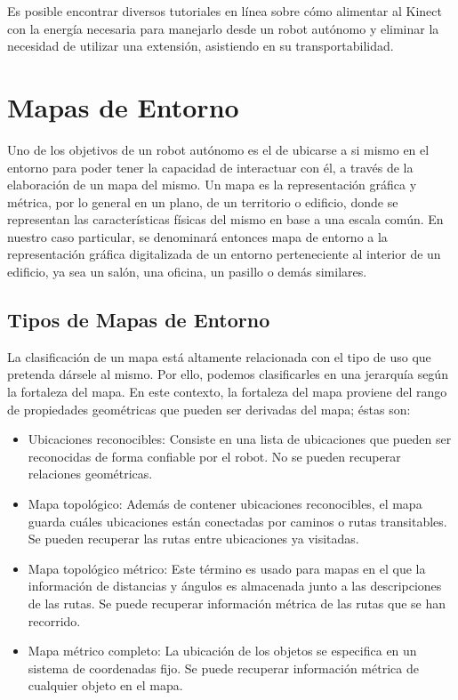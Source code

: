 Es posible encontrar diversos tutoriales en línea \cite{batterypoweredkinect} sobre cómo alimentar al Kinect con la energía necesaria para manejarlo desde un robot autónomo y eliminar la necesidad de utilizar una extensión, asistiendo en su transportabilidad.

\section{Mapas de Entorno}

Uno de los objetivos de un robot autónomo es el de ubicarse a si mismo en el entorno para poder tener la capacidad de interactuar con él, a través de la elaboración de un mapa del mismo. Un mapa es la representación gráfica y métrica, por lo general en un plano, de un territorio o edificio, donde se representan las características físicas del mismo en base a una escala común. En nuestro caso particular, se denominará entonces mapa de entorno a la representación gráfica digitalizada de un entorno perteneciente al interior de un edificio, ya sea un salón, una oficina, un pasillo o demás similares.

\subsection{Tipos de Mapas de Entorno}

La clasificación de un mapa está altamente relacionada con el tipo de uso que pretenda dársele al mismo. \cite{Lee200309} Por ello, podemos clasificarles en una jerarquía según la fortaleza del mapa. En este contexto, la fortaleza del mapa proviene del rango de propiedades geométricas que pueden ser derivadas del mapa; éstas son:

\begin{itemize}
	\itemsep1pt \parskip1pt 
	\item Ubicaciones reconocibles: Consiste en una lista de ubicaciones que pueden ser reconocidas de forma confiable por el robot. No se pueden recuperar relaciones geométricas.
	\item Mapa topológico: Además de contener ubicaciones reconocibles, el mapa guarda cuáles ubicaciones están conectadas por caminos o rutas transitables. Se pueden recuperar las rutas entre ubicaciones ya visitadas.
	\item Mapa topológico métrico: Este término es usado para mapas en el que la información de distancias y ángulos es almacenada junto a las descripciones de las rutas. Se puede recuperar información métrica de las rutas que se han recorrido.
	\item Mapa métrico completo: La ubicación de los objetos se especifica en un sistema de coordenadas fijo. Se puede recuperar información métrica de cualquier objeto en el mapa.
\end{itemize}

